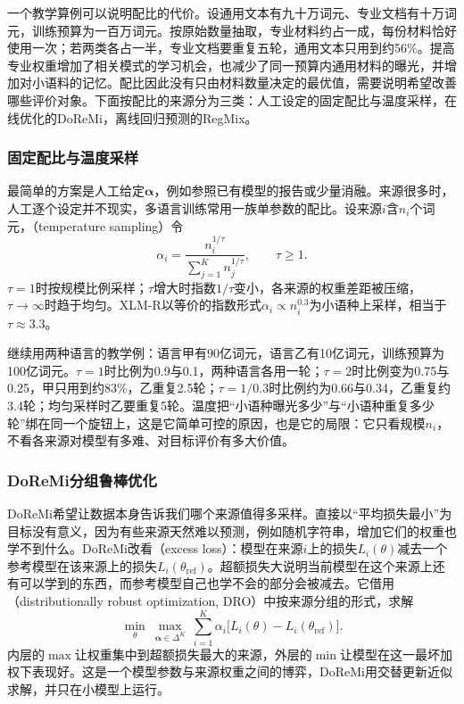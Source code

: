 一个教学算例可以说明配比的代价。设通用文本有九十万词元、专业文档有十万词元，训练预算为一百万词元。按原始数量抽取，专业材料约占一成，每份材料恰好使用一次；若两类各占一半，专业文档要重复五轮，通用文本只用到约56\%。提高专业权重增加了相关模式的学习机会，也减少了同一预算内通用材料的曝光，并增加对小语料的记忆。配比因此没有只由材料数量决定的最优值，需要说明希望改善哪些评价对象。下面按配比的来源分为三类：人工设定的固定配比与温度采样，在线优化的DoReMi，离线回归预测的RegMix。

\subsubsection{固定配比与温度采样}
\label{sec:nlp-llm-temperature-sampling}

最简单的方案是人工给定$\bm\alpha$，例如参照已有模型的报告或少量消融。来源很多时，人工逐个设定并不现实，多语言训练常用一族单参数的配比。设来源$i$含$n_i$个词元，（temperature sampling）令
\begin{equation}
  \alpha_i=\frac{n_i^{1/\tau}}{\sum_{j=1}^{K}n_j^{1/\tau}},\qquad \tau\geq1.
  \label{eq:nlp-llm-temperature-sampling}
\end{equation}
$\tau=1$时按规模比例采样；$\tau$增大时指数$1/\tau$变小，各来源的权重差距被压缩，$\tau\to\infty$时趋于均匀。XLM-R以等价的指数形式$\alpha_i\propto n_i^{0.3}$为小语种上采样，相当于$\tau\approx3.3$。

继续用两种语言的教学例：语言甲有90亿词元，语言乙有10亿词元，训练预算为100亿词元。$\tau=1$时比例为0.9与0.1，两种语言各用一轮；$\tau=2$时比例变为0.75与0.25，甲只用到约83\%，乙重复2.5轮；$\tau=1/0.3$时比例约为0.66与0.34，乙重复约3.4轮；均匀采样时乙要重复5轮。温度把“小语种曝光多少”与“小语种重复多少轮”绑在同一个旋钮上，这是它简单可控的原因，也是它的局限：它只看规模$n_i$，不看各来源对模型有多难、对目标评价有多大价值。

\subsubsection{DoReMi分组鲁棒优化}
\label{sec:nlp-llm-doremi}

DoReMi希望让数据本身告诉我们哪个来源值得多采样。直接以“平均损失最小”为目标没有意义，因为有些来源天然难以预测，例如随机字符串，增加它们的权重也学不到什么。DoReMi改看（excess loss）：模型在来源$i$上的损失$L_i(\theta)$减去一个参考模型在该来源上的损失$L_i(\theta_{\mathrm{ref}})$。超额损失大说明当前模型在这个来源上还有可以学到的东西，而参考模型自己也学不会的部分会被减去。它借用（distributionally robust optimization, DRO）中按来源分组的形式，求解
\begin{equation}
  \min_{\theta}\ \max_{\bm\alpha\in\Delta^{K}}\
  \sum_{i=1}^{K}\alpha_i\bigl[L_i(\theta)-L_i(\theta_{\mathrm{ref}})\bigr].
  \label{eq:nlp-llm-doremi}
\end{equation}
内层的$\max$让权重集中到超额损失最大的来源，外层的$\min$让模型在这一最坏加权下表现好。这是一个模型参数与来源权重之间的博弈，DoReMi用交替更新近似求解，并只在小模型上运行。

